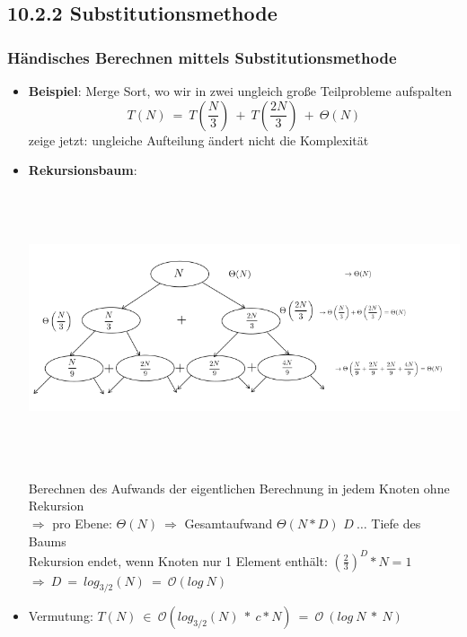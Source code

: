 \documentclass[11pt, fleqn]{scrreprt}
\newcommand{\bigO}[0]{\mathcal{O}}
\begin{document}
    \subsection*{10.2.2 Substitutionsmethode}
    \subsubsection*{Händisches Berechnen mittels Substitutionsmethode}
    \begin{itemize}
        \item \textbf{Beispiel}: Merge Sort, wo wir in zwei ungleich große Teilprobleme aufspalten \\
        \[ T(N)\ =\ T\left(\frac{N}{3}\right)\ +\ T\left(\frac{2N}{3}\right)\ +\ \Theta(N)\]
        zeige jetzt: ungleiche Aufteilung ändert nicht die Komplexität
        \item \textbf{Rekursionsbaum}:\\
        \begin{center}
        \includegraphics[width=15cm,height=8cm,keepaspectratio]{./Pictures/Substitutionsmethode.png}
        \end{center}
        Berechnen des Aufwands der eigentlichen Berechnung in jedem Knoten ohne Rekursion\\
        $\Rightarrow$ pro Ebene: $\Theta(N) \ \Rightarrow$ Gesamtaufwand $\Theta(N*D)$ $D\ \dots$ Tiefe des Baums \\
        Rekursion endet, wenn Knoten nur 1 Element enthält: $\left(\frac{2}{3}\right)^D * N = 1$\\
        \hspace*{1cm} $\Rightarrow\ D\ =\ log_{3/2}(N)\ = \ \bigO{}(log\ N)$
        \item Vermutung: $T(N)\ \in\ \bigO{}(log_{3/2}(N)\ *\ c*N)\ =\ \bigO{}\ (log\ N\ *\ N)$\\

\end{itemize}
\end{document}
